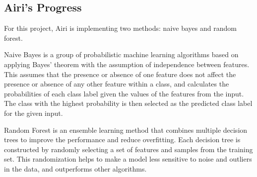 \subsection{Airi's Progress}

For this project, Airi is implementing two methods: naive bayes and random forest.

Naive Bayes is a group of probabilistic machine learning algorithms based on applying Bayes' theorem with the assumption of independence between features. This assumes that the presence or absence of one feature does not affect the presence or absence of any other feature within a class, and calculates the probabilities of each class label given the values of the features from the input. The class with the highest probability is then selected as the predicted class label for the given input.

Random Forest is an ensemble learning method that combines multiple decision trees to improve the performance and reduce overfitting. Each decision tree is constructed by randomly selecting a set of features and samples from the training set. This randomization helps to make a model less sensitive to noise and outliers in the data, and outperforms other algorithms.